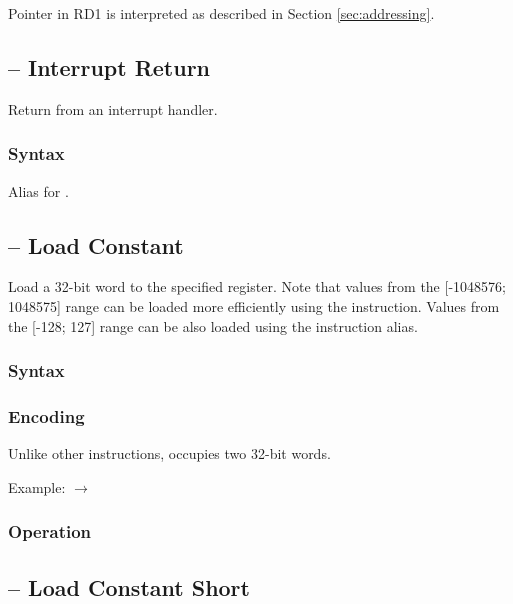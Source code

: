 \documentclass[a4paper,12pt,twoside,extrafontsizes]{memoir}
\begin{document}
{Pointer in RD1 is interpreted as described in Section \ref{sec:addressing}.

\subsection{ -- Interrupt Return}
\label{subsec:instr:iret}

Return from an interrupt handler.

\subsubsection{Syntax}


Alias for .

\subsection{ -- Load Constant}
\label{subsec:instr:lc}

Load a 32-bit word to the specified register. Note that values from the [-1048576; 1048575] range can be loaded more efficiently using the  instruction. Values from the [-128; 127] range can be also loaded using the  instruction alias.

\subsubsection{Syntax}


\subsubsection{Encoding}


Unlike other instructions,  occupies two 32-bit words.

Example:  $\rightarrow$ 

\subsubsection{Operation}


\subsection{ -- Load Constant Short}
\label{subsec:instr:lcs}

}
\end{document}
